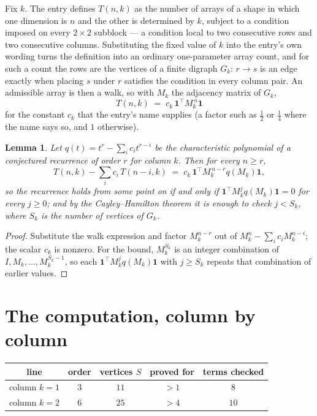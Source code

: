 \documentclass[11pt,a4paper]{article}
\theoremstyle{plain}
\newtheorem{lemma}[theorem]{Lemma}
\theoremstyle{definition}
\begin{document}
Fix $k$. The entry defines $T(n,k)$ as the number of arrays of a shape in which one dimension
is $n$ and the other is determined by $k$, subject to a condition imposed on every
$2\times2$ subblock --- a condition local to two consecutive rows and two consecutive columns.
Substituting the fixed value of $k$ into the entry's own wording turns the definition into an
ordinary one-parameter array count, and for such a count the rows are the vertices of a finite
digraph $G_k$: $r\to s$ is an edge exactly when placing $s$ under $r$ satisfies the condition
in every column pair. An admissible array is then a walk, so with $M_k$ the adjacency matrix
of $G_k$,
\[
T(n,k)\;=\;c_k\,\mathbf{1}^{\!\top}M_k^{\,n}\mathbf{1}
\]
for the constant $c_k$ that the entry's name supplies (a factor such as $\tfrac12$ or
$\tfrac14$ where the name says so, and $1$ otherwise).

\begin{lemma}\label{lem:crit}
Let $q(t)=t^{r}-\sum_i c_it^{r-i}$ be the characteristic polynomial of a conjectured
recurrence of order $r$ for column $k$. Then for every $n\ge r$,
\[
T(n,k)-\sum_i c_i\,T(n-i,k)\;=\;c_k\,\mathbf{1}^{\!\top}M_k^{\,n-r}q(M_k)\mathbf{1},
\]
so the recurrence holds from some point on if and only if
$\mathbf{1}^{\!\top}M_k^{j}q(M_k)\mathbf{1}=0$ for every $j\ge0$; and by the
Cayley--Hamilton theorem it is enough to check $j<S_k$, where $S_k$ is the number of vertices
of $G_k$.
\end{lemma}

\begin{proof}
Substitute the walk expression and factor $M_k^{n-r}$ out of $M_k^{n}-\sum_ic_iM_k^{n-i}$;
the scalar $c_k$ is nonzero. For the bound, $M_k^{S_k}$ is an integer combination of
$I,M_k,\dots,M_k^{S_k-1}$, so each $\mathbf{1}^{\!\top}M_k^{j}q(M_k)\mathbf{1}$ with
$j\ge S_k$ repeats that combination of earlier values.
\end{proof}

\section{The computation, column by column}

\begin{center}
\begin{tabular}{ccccc}
line & order & vertices $S$ & proved for & terms checked \\ \hline
column $k$$=1$ & $3$ & $11$ & $>1$ & $8$ \\
column $k$$=2$ & $6$ & $25$ & $>4$ & $10$ \\
\end{tabular}
\end{center}
\end{document}
